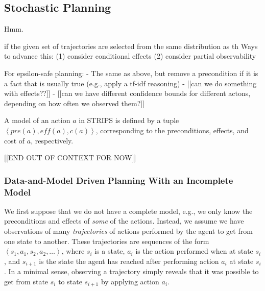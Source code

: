 \documentclass[12pt]{article}
\newcommand{\tuple}[1]{\ensuremath{\left \langle #1 \right \rangle }}
\newcommand{\eff}{\textit{eff}}
\newcommand{\pre}{\textit{pre}}
\begin{document}
\subsection{Stochastic Planning}
Hmm. 








if the given set of trajectories are selected from the same distribution as th
Ways to advance this:
(1) consider conditional effects
(2) consider partial observability

For epsilon-safe planning:
- The same as above, but remove a precondition if it is a fact that is usually true (e.g., apply a tf-idf reasoning)
- [[can we do something with effects??]]
- [[can we have different confidence bounds for different actons, depending on how often we observed them?]]




A model of an action $a$ in STRIPS is defined by a tuple $\tuple{\pre(a), \eff(a), c(a)}$, corresponding to the preconditions, effects, and cost of $a$, respectively. 

[[END OUT OF CONTEXT FOR NOW]]


\subsubsection{Data-and-Model Driven Planning With an Incomplete Model}
We first suppose that we do not have a complete model, e.g., we only know the preconditions and effects of {\em some} of the actions. Instead, we assume we have observations of many {\em trajectories} of actions performed by the agent to get from one state to another. These trajectories are sequences of the form $\tuple{ s_1, a_1, s_2, a_2, \ldots}$, where $s_i$ is a state, $a_i$ is the action performed when at state $s_i$, and $s_{i+1}$ is the state the agent has reached after performing action $a_i$ at state $s_i$. In a minimal sense, observing a trajectory simply reveals that it was possible to get from state $s_i$ to state $s_{i+1}$ by applying action $a_i$. %
\end{document}
